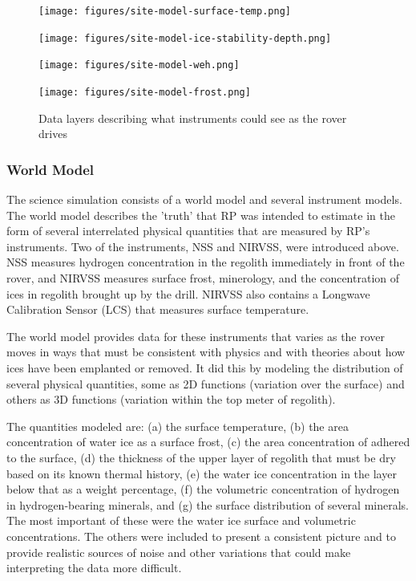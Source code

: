 \documentclass[twocolumn,letterpaper]{IEEEAerospaceCLS}  %
\begin{document}
\begin{figure}[htp]
\begin{subfloat}{
\texttt{[image: figures/site-model-surface-temp.png]}
}
\end{subfloat}
\qquad
\begin{subfloat}{
\texttt{[image: figures/site-model-ice-stability-depth.png]}
}
\end{subfloat}
\qquad
\begin{subfloat}{
\texttt{[image: figures/site-model-weh.png]}
}
\end{subfloat}
\qquad
\begin{subfloat}{
\texttt{[image: figures/site-model-frost.png]}
}
\end{subfloat}
\caption{Data layers describing what instruments could see as the rover drives
\label{fig:data-layers}}
\end{figure}

\subsubsection{World Model}
The science simulation consists of a world model and several instrument models.  
The world model describes the 'truth' that RP was intended to estimate in the form of several interrelated physical quantities that are measured by RP's instruments.  
Two of the instruments, NSS and NIRVSS, were introduced above.  
NSS measures hydrogen concentration in the regolith immediately in front of the rover, and NIRVSS measures surface frost, minerology, and the concentration of ices in regolith brought up by the drill.  
NIRVSS also contains a Longwave Calibration Sensor (LCS) that measures surface temperature.

The world model provides data for these instruments that varies as the rover moves in ways that must be consistent with physics and with theories about how ices have been emplanted or removed.  
It did this by modeling the distribution of several physical quantities, some as 2D functions (variation over the surface) and others as 3D functions (variation within the top meter of regolith).

The quantities modeled are: (a) the surface temperature, (b) the area concentration of water ice as a surface frost, (c) the area concentration of  adhered to the surface, (d) the thickness of the upper layer of regolith that must be dry based on its known thermal history, (e) the water ice concentration in the layer below that as a weight percentage, (f) the volumetric concentration of hydrogen in hydrogen-bearing minerals, and (g) the surface distribution of several minerals.  
The most important of these were the water ice surface and volumetric concentrations.  
The others were included to present a consistent picture and to provide realistic sources of noise and other variations that could make interpreting the data more difficult.
\end{document}
